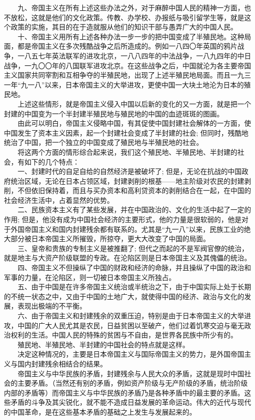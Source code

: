 \documentclass[cn,11pt,chinese]{elegantbook}
\begin{document}
　　九、帝国主义在所有上述这些办法之外，对于麻醉中国人民的精神一方面，也不放松，这就是他们的文化政策。传教、办学校、办报纸与吸引留学生等，就是这个政策的实施，其目的在于造就服从他们的知识干部与愚弄广大的中国人民。\\
　　十、帝国主义用所有上述各种办法一步一步的把中国变成了半殖民地。这种局面，都是帝国主义在多次残酷战争之后所造成的。例如一八四〇年英国的鸦片战争，一八五七年英法联军的进攻北京，一八八四年的中法战争，一八九四年的中日战争，一九〇〇年的八国联军进攻北京。在这些战争之后，中国就沦为各主要帝国主义国家共同宰割和互相争夺的半殖民地，出现了上述半殖民地局面。而且一九三一年“九一八”以来，日本帝国主义的大举进攻，更使中国一大块土地沦为日本的殖民地。\\
　　上述这些情形，就是帝国主义侵入中国以后新的变化的又一方面，就是把一个封建的中国变为一个半封建半殖民地与殖民地的中国的血迹斑斑的图画。\\
　　由此可以明白，帝国主义侵略中国，有其促使中国封建社会解体的一方面，使中国发生了资本主义因素，起一个封建社会变成了半封建的社会; 但同时，残酷地统治了中国，把一个独立的中国变成了殖民地与半殖民地的社会。\\
　　将这两个方面的情形综合起来说，我们这个殖民地、半殖民地、半封建的社会，有如下的几个特点：\\
　　一、封建时代的自足自给的自然经济是被破坏了; 但是，无论在抗战的中国政府统治区域，无论在日本占领区域，封建剥削的根基——地主阶级对农民的封建剥削，不但依旧保持着，而且与买办资本和高利贷资本的剥削结合在一起，在中国的社会经济生活中，占着显然的优势。\\
　　二、民族资本主义有了某些发展，并在中国政治的、文化的生活中起了一定的作用; 但是，他没有成为中国社会经济的主要形式，他的力量是很软弱的，他是对于外国帝国主义和国内封建残余都有联系的。尤其是“九一八”以来，民族工业的绝大部分被日本帝国主义所摧毁，所掠夺，更大大改变了中国的局面。\\
　　三、皇帝和贵族的专制主义是被推翻了; 但代之而起的不是军阀官僚的统治，就是地主与大资产阶级联盟的专政。在沦陷区则是日本帝国主义及其傀儡的统治。\\
　　四、帝国主义不但操纵了中国的财政和经济的命脉，并且操纵了中国的政治和军事的力量，在沦陷区，则一切被日本帝国主义所独占。\\
　　五、由于中国是在许多帝国主义统治或半统治之下，由于中国实际上处于长期的不统一状态之中，又由于中国的土地广大，就使得中国的经济、政治与文化的发展，表现出极端的不平衡。\\
　　六、由于帝国主义和封建残余的双重压迫，特别是由于日本帝国主义的大举进攻，中国的广大人民尤其是农民，日益贫困以至破产，他们过着饥寒交迫与毫无政治权利的生活。中国人民的特殊的贫困与不自由，是世界各民族中所少有的。\\
　　殖民地、半殖民地、半封建的中国社会的特点就是这样。\\
　　决定这种情况的，主要是日本帝国主义与国际帝国主义的势力，是外国帝国主义与国内封建残余相结合的结果。\\
　　帝国主义与中华民族的矛盾，封建残余与人民大众的矛盾，这就是现时中国社会的主要矛盾。（当然还有别的矛盾，例如资产阶级与无产阶级的矛盾，统治阶级内部的矛盾等）而帝国主义与中华民族的矛盾乃是各种矛盾中的最主要的矛盾。这些矛盾的斗争及其尖锐化，就不能不造成日益发展的革命运动。伟大的近代与现代的中国革命，是在这些基本矛盾的基础之上发生与发展起来的。\\
\end{document}

